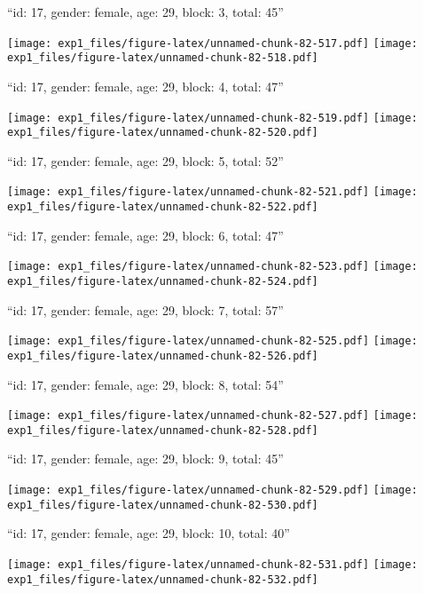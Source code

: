 \documentclass[11pt,,]{article}
\begin{document}
\newpage
[1] 

``id: 17, gender: female, age: 29, block: 3, total: 45''

\texttt{[image: exp1\_files/figure-latex/unnamed-chunk-82-517.pdf]}
\texttt{[image: exp1\_files/figure-latex/unnamed-chunk-82-518.pdf]}

\newpage
[1] 

``id: 17, gender: female, age: 29, block: 4, total: 47''

\texttt{[image: exp1\_files/figure-latex/unnamed-chunk-82-519.pdf]}
\texttt{[image: exp1\_files/figure-latex/unnamed-chunk-82-520.pdf]}

\newpage
[1] 

``id: 17, gender: female, age: 29, block: 5, total: 52''

\texttt{[image: exp1\_files/figure-latex/unnamed-chunk-82-521.pdf]}
\texttt{[image: exp1\_files/figure-latex/unnamed-chunk-82-522.pdf]}

\newpage
[1] 

``id: 17, gender: female, age: 29, block: 6, total: 47''

\texttt{[image: exp1\_files/figure-latex/unnamed-chunk-82-523.pdf]}
\texttt{[image: exp1\_files/figure-latex/unnamed-chunk-82-524.pdf]}

\newpage
[1] 

``id: 17, gender: female, age: 29, block: 7, total: 57''

\texttt{[image: exp1\_files/figure-latex/unnamed-chunk-82-525.pdf]}
\texttt{[image: exp1\_files/figure-latex/unnamed-chunk-82-526.pdf]}

\newpage
[1] 

``id: 17, gender: female, age: 29, block: 8, total: 54''

\texttt{[image: exp1\_files/figure-latex/unnamed-chunk-82-527.pdf]}
\texttt{[image: exp1\_files/figure-latex/unnamed-chunk-82-528.pdf]}

\newpage
[1] 

``id: 17, gender: female, age: 29, block: 9, total: 45''

\texttt{[image: exp1\_files/figure-latex/unnamed-chunk-82-529.pdf]}
\texttt{[image: exp1\_files/figure-latex/unnamed-chunk-82-530.pdf]}

\newpage
[1] 

``id: 17, gender: female, age: 29, block: 10, total: 40''

\texttt{[image: exp1\_files/figure-latex/unnamed-chunk-82-531.pdf]}
\texttt{[image: exp1\_files/figure-latex/unnamed-chunk-82-532.pdf]}
\end{document}
